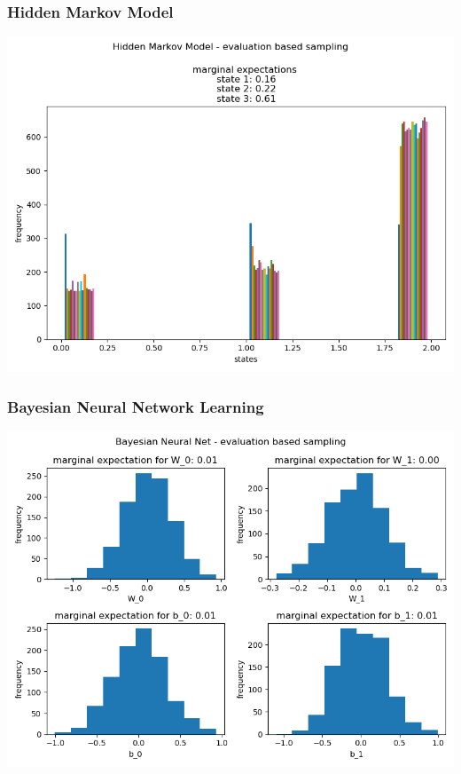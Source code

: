 \documentclass[10pt]{homeworg}
\begin{document}
\subsubsection{Hidden Markov Model}
\begin{center}
\includegraphics[scale=0.5]{figures/evaluation_3}
\end{center}

\subsubsection{Bayesian Neural Network Learning}
\begin{center}
\includegraphics[scale=0.5]{figures/evaluation_4}
\end{center}
\end{document}
